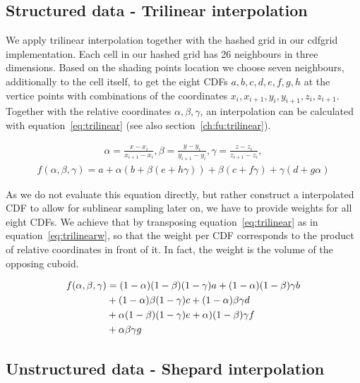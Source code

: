 \subsection{Structured data - Trilinear interpolation}
\label{ch:trilinear}

We apply trilinear interpolation together with the hashed grid in our cdfgrid implementation. Each cell in our hashed grid has 26 neighbours in three dimensions. Based on the shading points location we choose seven neighbours, additionally to the cell itself, to get the eight CDFs $a,b,c,d,e,f,g,h$ at the vertice points with combinations of the coordinates $x_i, x_{i+1}, y_i, y_{i+1}, z_i, z_{i+1}$. Together with the relative coordinates $\alpha, \beta, \gamma$, an interpolation can be calculated with equation~\ref{eq:trilinear} (see also section~\ref{ch:fu:trilinear}).

\begin{align}
    \alpha = \frac{x-x_i}{x_{i+1}-x_i}, \beta = \frac{y-y_i}{y_{i+1}-y_i}, \gamma = \frac{z-z_i}{z_{i+1}-z_i},
\end{align}
\begin{align}\label{eq:trilinear}
    f(\alpha, \beta, \gamma) = a + \alpha\left(b + \beta(e + h\gamma)\right) + \beta(c + f\gamma) + \gamma(d + g\alpha)
\end{align}

As we do not evaluate this equation directly, but rather construct a interpolated CDF to allow for sublinear sampling later on, we have to provide weights for all eight CDFs. We achieve that by transposing equation~\ref{eq:trilinear} as in equation~\ref{eq:trilinearw}, so that the weight per CDF corresponds to the product of relative coordinates in front of it. In fact, the weight is the volume of the opposing cuboid.


\begin{align}\label{eq:trilinearw}
    f(\alpha, \beta, \gamma) &= (1-\alpha)(1-\beta)(1-\gamma)a + (1-\alpha)(1-\beta)\gamma b  \notag \\
    &+ (1-\alpha)\beta(1-\gamma)c  + (1-\alpha)\beta\gamma d \\
    &+ \alpha(1-\beta)(1-\gamma)e + \alpha)(1-\beta)\gamma f \notag \\
    &+ \alpha\beta\gamma g  \notag
\end{align}


\subsection{Unstructured data - Shepard interpolation}
\label{ch:unstructured}

